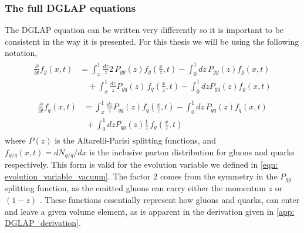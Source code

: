 \documentclass[main.tex]{subfiles}
\begin{document}
\subsubsection*{The full DGLAP equations}
The DGLAP equation can be written very differently so it is important to be consistent in the way it is presented. For this thesis we will be using the following notation,
\begin{align}
    \begin{split}
    \frac{\partial}{\partial t} f_g(x,t) &= \int_x^1 \frac{dz}{z} 2\,P_{gg}(z) f_g(\frac{x}{z},t) - \int_0^1 dz\, P_{gg}(z) f_g(x,t) \\
    &\quad + \int_x^1 \frac{dz}{z} P_{gq}(z) \, f_q(\frac{x}{z},t) - \int_0^1 dz P_{gq}(z) f_g(x,t)
    \end{split}\label{eqn: DGLAP_fg(x,t)}
\end{align}
\begin{align}
    \begin{split}
    \frac{\partial}{\partial t} f_q(x,t) &=  \int_x^1 \frac{dz}{z} P_{qq}(z) f_q(\frac{x}{z},t) - \int_0^1 dz\, P_{qq}(z) f_q(x,t) \\
    &\; + \int_0^1 dz P_{qg}(z) \frac{1}{z}\, f_g(\frac{x}{z},t)
    \end{split}\label{eqn: DGLAP_fq(x,t)}
\end{align}
where \(P(z)\) is the Altarelli-Parisi splitting functions, and \(f_{g/q}(x,t) = dN_{g/q}/dx\) is the inclusive parton distribution for gluons and quarks respectively. This form is valid for the evolution variable we defined in \autoref{eqn: evolution_variable_vacuum}.
The factor \(2\) comes from the symmetry in the \(P_{gg}\) splitting function, as the emitted gluons can carry either the momentum \(z\) or \((1-z)\) . These functions essentially represent how gluons and quarks, can enter and leave a given volume element, as is apparent in the derivation given in \autoref{app: DGLAP_derivation}.
\end{document}
